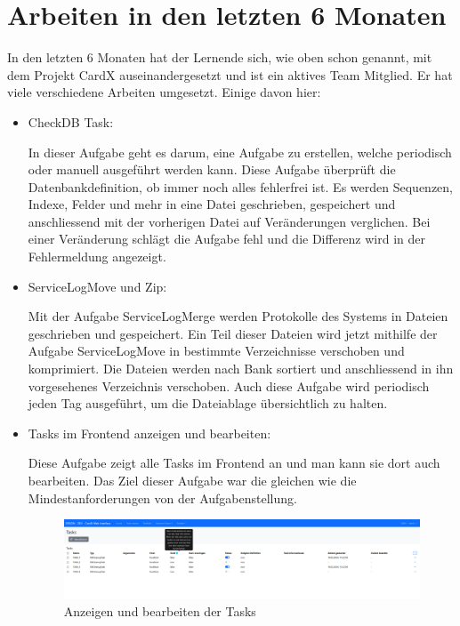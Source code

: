 \section{Arbeiten in den letzten 6 Monaten}\label{sec:arbeiten-in-den-letzten-6-monaten}
In den letzten 6 Monaten hat der Lernende sich, wie oben schon genannt, mit dem Projekt CardX auseinandergesetzt und ist ein aktives Team Mitglied. Er hat viele verschiedene Arbeiten umgesetzt. Einige davon hier:
\begin{itemize}
    \item CheckDB Task:
    
    In dieser Aufgabe geht es darum, eine Aufgabe zu erstellen, welche periodisch oder manuell ausgeführt werden kann. Diese Aufgabe überprüft die Datenbankdefinition, ob immer noch alles fehlerfrei ist. Es werden Sequenzen, Indexe, Felder und mehr in eine Datei geschrieben, gespeichert und anschliessend mit der vorherigen Datei auf Veränderungen verglichen. Bei einer Veränderung schlägt die Aufgabe fehl und die Differenz wird in der Fehlermeldung angezeigt.
    
    \item ServiceLogMove und Zip:
    
    Mit der Aufgabe ServiceLogMerge werden Protokolle des Systems in Dateien geschrieben und gespeichert. Ein Teil dieser Dateien wird jetzt mithilfe der Aufgabe ServiceLogMove in bestimmte Verzeichnisse verschoben und komprimiert. Die Dateien werden nach Bank sortiert und anschliessend in ihn vorgesehenes Verzeichnis verschoben. Auch diese Aufgabe wird periodisch jeden Tag ausgeführt, um die Dateiablage übersichtlich zu halten.
    
    \item Tasks im Frontend anzeigen und bearbeiten:
    
    Diese Aufgabe zeigt alle Tasks im Frontend an und man kann sie dort auch bearbeiten. Das Ziel dieser Aufgabe war die gleichen wie die Mindestanforderungen von der Aufgabenstellung.
    \begin{figure}[H]
    	\begin{center}
    		\includegraphics[width=1\textwidth]{ressourcen/show-and-edit-tasks}
    		\caption[Anzeigen und bearbeiten der Tasks]{Anzeigen und bearbeiten der Tasks}\label{fig:show-and-edit-tasks}
    	\end{center}
    \end{figure}
\end{itemize}
